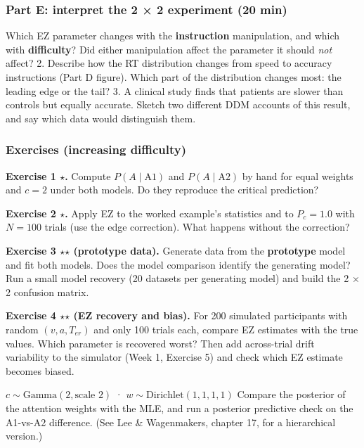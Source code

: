 \subsubsection{Part E: interpret the 2 × 2 experiment (20 min)}

Which EZ parameter changes with the \textbf{instruction} manipulation,
and which with \textbf{difficulty}? Did either manipulation affect the
parameter it should \emph{not} affect? 2. Describe how the RT
distribution changes from speed to accuracy instructions (Part D
figure). Which part of the distribution changes most: the leading edge
or the tail? 3. A clinical study finds that patients are slower than
controls but equally accurate. Sketch two different DDM accounts of this
result, and say which data would distinguish them.

\subsubsection{Exercises (increasing difficulty)}

\textbf{Exercise 1 \ensuremath{\star}.} Compute \(P(A\mid\text{A1})\) and
\(P(A\mid\text{A2})\) by hand for equal weights and \(c = 2\) under both
models. Do they reproduce the critical prediction?

\textbf{Exercise 2 \ensuremath{\star}.} Apply EZ to the worked example's statistics and
to \(P_c = 1.0\) with \(N = 100\) trials (use the edge correction). What
happens without the correction?

\textbf{Exercise 3 \ensuremath{\star}\ensuremath{\star} (prototype data).} Generate data from the
\textbf{prototype} model and fit both models. Does the model comparison
identify the generating model? Run a small model recovery (20 datasets
per generating model) and build the 2 × 2 confusion matrix.

\textbf{Exercise 4 \ensuremath{\star}\ensuremath{\star} (EZ recovery and bias).} For 200 simulated
participants with random \((v, a, T_{er})\) and only 100 trials each,
compare EZ estimates with the true values. Which parameter is recovered
worst? Then add across-trial drift variability to the simulator (Week 1,
Exercise 5) and check which EZ estimate becomes biased.

\(c \sim \mathrm{Gamma}(2, \text{scale } 2)\) ·
\(w \sim \mathrm{Dirichlet}(1, 1, 1, 1)\) Compare the posterior of the
attention weights with the MLE, and run a posterior predictive check on
the A1-vs-A2 difference. (See Lee \& Wagenmakers, chapter 17, for a
hierarchical version.)

